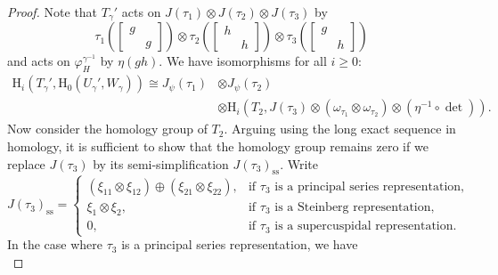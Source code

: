 \documentclass[12pt]{amsart}
\newcommand{\RH}{{\mathrm {H}}}
\theoremstyle{Theorem}
\theoremstyle{Theorem}
\theoremstyle{Theorem}
\theoremstyle{Theorem}
\theoremstyle{Plain}
\theoremstyle{remark}
\theoremstyle{remark}
\theoremstyle{Definition}
\begin{document}
\begin{proof}
    Note that $T_\gamma'$ acts on $ J( \tau_1 ) \otimes J( \tau_2 ) \otimes J( \tau_3 ) $ by
    \[
        \tau_1 \left(
        \begin{bmatrix}
            g &  \\
              & g
        \end{bmatrix}
        \right) \otimes \tau_2 \left( 
        \begin{bmatrix}
            h &  \\
              & h
        \end{bmatrix}
        \right) \otimes \tau_3 \left(
        \begin{bmatrix}
            g &  \\
              & h
        \end{bmatrix}
        \right)
    \]
    and acts on $ \varphi_H^{ \gamma^{-1} } $ by $ \eta(gh) $. We have isomorphisms for all $ i \ge 0 $:
    \[
        \begin{aligned}
            \RH_i
            \left(
                T_\gamma', \RH_0 ( U_\gamma', W_\gamma )
            \right)
            \cong J_\psi ( \tau_1 ) 
            &\otimes J_\psi ( \tau_2 )\\
            &\otimes \RH_i
            \left(  
                T_2, J( \tau_3 ) \otimes \left( \omega_{ \tau_1 } \otimes \omega_{ \tau_2 } \right) \otimes \left( \eta^{-1} \circ \det \right) 
            \right).
        \end{aligned}
    \]
    Now consider the homology group of $T_2$. Arguing using the long exact sequence in homology, it is sufficient to show that the homology group remains zero if we replace $ J( \tau_3 ) $ by its semi-simplification $ J( \tau_3 )_\mathrm{ss} $. Write
    \[
        J( \tau_3 )_\mathrm{ss} = 
        \begin{cases}
            ( \xi_{11} \otimes \xi_{12} ) \oplus ( \xi_{21} \otimes \xi_{22} ), & \text{if } \tau_3 \text{ is a principal series representation,}\\
            \xi_1 \otimes \xi_2,                                                & \text{if } \tau_3 \text{ is a Steinberg representation,}       \\
            0,                                                                  & \text{if } \tau_3 \text{ is a supercuspidal representation.}
        \end{cases}
    \]
    In the case where $\tau_3$ is a principal series representation, we have
    \begin{equation}

\end{equation}
\end{proof}
\end{document}
